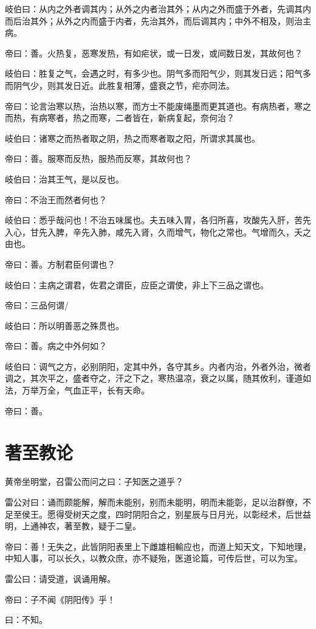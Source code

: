 \documentclass{article}%
\begin{document}
岐伯曰：从内之外者调其内；从外之内者治其外；从内之外而盛于外者，先调其内而后治其外；从外之内而盛于内者，先治其外，而后调其内；中外不相及，则治主病。

帝曰：善。火热复，恶寒发热，有如疟状，或一日发，或间数日发，其故何也？

岐伯曰：胜复之气，会遇之时，有多少也。阴气多而阳气少，则其发日远；阳气多而阴气少，则其发日近。此胜复相薄，盛衰之节，疟亦同法。

帝曰：论言治寒以热，治热以寒，而方士不能废绳墨而更其道也。有病热者，寒之而热，有病寒者，热之而寒，二者皆在，新病复起，奈何治？

岐伯曰：诸寒之而热者取之阴，热之而寒者取之阳，所谓求其属也。

帝曰：善。服寒而反热，服热而反寒，其故何也？

岐伯曰：治其王气，是以反也。

帝曰：不治王而然者何也？

岐伯曰：悉乎哉问也！不治五味属也。夫五味入胃，各归所喜，攻酸先入肝，苦先入心，甘先入脾，辛先入肺，咸先入肾，久而增气，物化之常也。气增而久，夭之由也。

帝曰：善。方制君臣何谓也？

岐伯曰：主病之谓君，佐君之谓臣，应臣之谓使，非上下三品之谓也。

帝曰：三品何谓/

岐伯曰：所以明善恶之殊贯也。

帝曰：善。病之中外何如？

岐伯曰：调气之方，必别阴阳，定其中外，各守其乡。内者内治，外者外治，微者调之，其次平之，盛者夺之，汗之下之，寒热温凉，衰之以属，随其攸利，谨道如法，万举万全，气血正平，长有天命。

帝曰：善。
\section{著至教论}
黄帝坐明堂，召雷公而问之曰：子知医之道乎？

雷公对曰：诵而颇能解，解而未能别，别而未能明，明而未能彰，足以治群僚，不足至侯王。愿得受树天之度，四时阴阳合之，别星辰与日月光，以彰经术，后世益明，上通神农，著至教，疑于二皇。

帝曰：善！无失之，此皆阴阳表里上下雌雄相輸应也，而道上知天文，下知地理，中知人事，可以长久，以教众庶，亦不疑殆，医道论篇，可传后世，可以为宝。

雷公曰：请受道，讽诵用解。

帝曰：子不闻《阴阳传》乎！

曰：不知。
\end{document}
